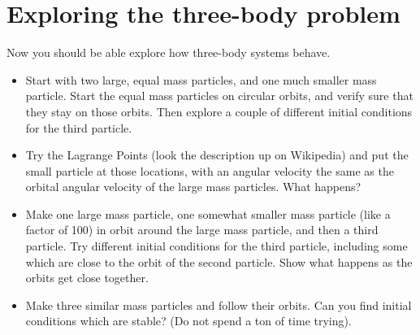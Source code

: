 \documentclass[11pt, preprint]{aastex}
\begin{document}
\section{Exploring the three-body problem}

Now you should be able explore how three-body systems behave. 

\begin{itemize}
\item Start with two large, equal mass particles, and one much smaller
  mass particle. Start the equal mass particles on circular orbits,
  and verify sure that they stay on those orbits. Then explore a
  couple of different initial conditions for the third particle.
\item Try the Lagrange Points (look the description up on Wikipedia)
  and put the small particle at those locations, with an angular
  velocity the same as the orbital angular velocity of the large mass
  particles. What happens?
\item Make one large mass particle, one somewhat smaller mass particle
  (like a factor of 100) in orbit around the large mass particle, and
  then a third particle. Try different initial conditions for the
  third particle, including some which are close to the orbit of the
  second particle. Show what happens as the orbits get close together.
\item Make three similar mass particles and follow their orbits. Can
  you find initial conditions which are stable? (Do not spend a ton of
  time trying).
\end{itemize}
\end{document}
